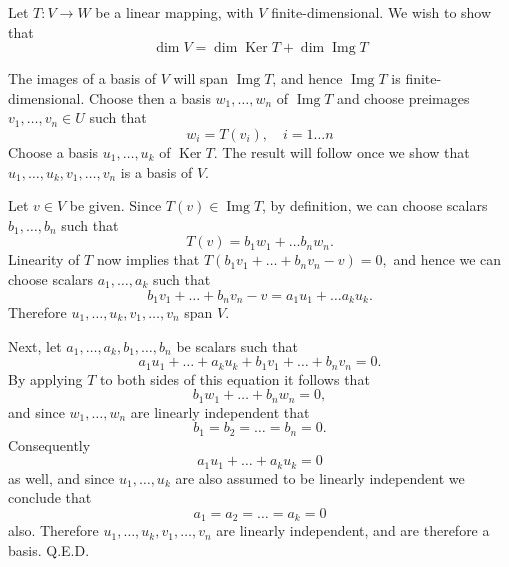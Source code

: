 \documentclass{article}
\newcommand{\Ker}{\mathop{\mathrm{Ker}}}
\newcommand{\Img}{\mathop{\mathrm{Img}}}
\begin{document}
Let $T:V\rightarrow W$ be a linear mapping, with $V$
finite-dimensional.  We wish to show that
$$\dim V = \dim \Ker T + \dim\Img T$$

The images of a basis of $V$ will span $\Img T$, and hence $\Img T$ is
finite-dimensional.  Choose then a basis $w_1,\ldots,w_n$ of $\Img T$
and choose preimages $v_1,\ldots,v_n\in U$ such that 
$$w_i = T(v_i),\quad i=1\ldots n$$
Choose a basis $u_1,\ldots,u_k$ of $\Ker T$.  The result will follow
once we show that $u_1,\ldots,u_k,v_1,\ldots,v_n$ is a basis of $V$.

Let $v\in V$ be given.  Since $T(v)\in \Img T$, by definition, we can
choose scalars $b_1,\ldots,b_n$ such that
$$T(v)= b_1 w_1 + \ldots b_n w_n.$$
Linearity of $T$ now implies that
$T(b_1 v_1 + \ldots + b_n v_n-v) = 0,$
and hence we can choose scalars $a_1,\ldots, a_k$ such that
$$b_1 v_1 + \ldots + b_n v_n-v = a_1 u_1 + \ldots a_k u_k.$$
Therefore $u_1,\ldots,u_k,v_1,\ldots,v_n$ span $V$.

Next, let $a_1,\ldots, a_k,b_1,\ldots,b_n$ be scalars such that
$$a_1 u_1+\ldots +a_k u_k + b_1 v_1 + \ldots + b_n v_n = 0.$$
By applying $T$ to both sides of this equation it follows that
$$b_1 w_1 + \ldots + b_n w_n =0,$$
and since $w_1,\ldots, w_n$ are linearly independent that
$$b_1= b_2 = \ldots = b_n = 0.$$
Consequently 
$$a_1 u_1+\ldots +a_k u_k = 0$$
as well, and since $u_1,\ldots, u_k$ are also assumed to be linearly
independent we conclude that
$$a_1= a_2 = \ldots = a_k = 0$$
also.  Therefore $u_1,\ldots,u_k,v_1,\ldots,v_n$ are linearly
independent, and are therefore a basis. Q.E.D.
\end{document}
